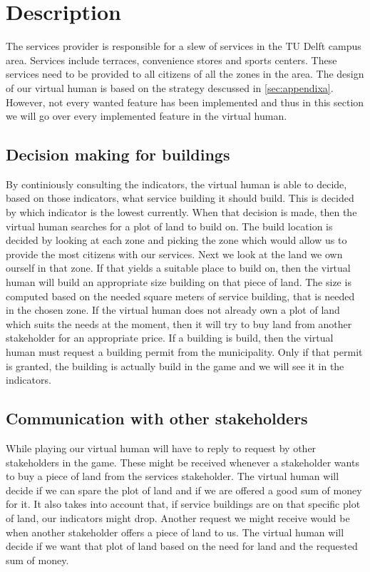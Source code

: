 \section{Description}
The services provider is responsible for a slew of services in the TU Delft campus area. Services include terraces, convenience stores and sports centers. These services need to be provided to all citizens of all the zones in the area. The design of our virtual human is based on the strategy descussed in \ref{sec:appendixa}. However, not every wanted feature has been implemented and thus in this section we will go over every implemented feature in the virtual human.

\subsection{Decision making for buildings}
By continiously consulting the indicators, the virtual human is able to decide, based on those indicators, what service building it should build. This is decided by which indicator is the lowest currently. When that decision is made, then the virtual human searches for a plot of land to build on. The build location is decided by looking at each zone and picking the zone which would allow us to provide the most citizens with our services. Next we look at the land we own ourself in that zone. If that yields a suitable place to build on, then the virtual human will build an appropriate size building on that piece of land. The size is computed based on the needed square meters of service building, that is needed in the chosen zone. If the virtual human does not already own a plot of land which suits the needs at the moment, then it will try to buy land from another stakeholder for an appropriate price. 
If a building is build, then the virtual human must request a building permit from the municipality. Only if that permit is granted, the building is actually build in the game and we will see it in the indicators. 

\subsection{Communication with other stakeholders}
While playing our virtual human will have to reply to request by other stakeholders in the game. These might be received whenever a stakeholder wants to buy a piece of land from the services stakeholder. The virtual human will decide if we can spare the plot of land and if we are offered a good sum of money for it. It also takes into account that, if service buildings are on that specific plot of land, our indicators might drop. Another request we might receive would be when another stakeholder offers a piece of land to us. The virtual human will decide if we want that plot of land based on the need for land and the requested sum of money.


